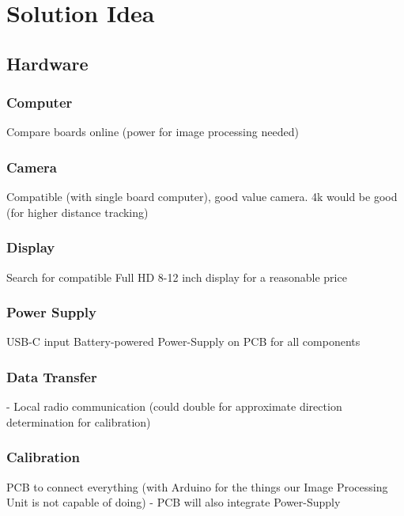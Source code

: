 \chapter{Solution Idea}


\section{Hardware}

\subsection{Computer}

Compare boards online (power for image processing needed)

\subsection{Camera}

Compatible (with single board computer), good value camera. 4k would be good (for higher distance tracking)

\subsection{Display}

Search for compatible Full HD 8-12 inch display for a reasonable price

\subsection{Power Supply}

USB-C input
Battery-powered
Power-Supply on PCB for all components

\subsection{Data Transfer}

- Local radio communication (could double for approximate direction determination for calibration)

\subsection{Calibration}

PCB to connect everything (with Arduino for the things our Image Processing Unit is not capable of doing)
- PCB will also integrate Power-Supply

